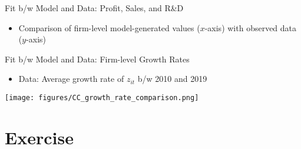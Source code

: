\documentclass[
  10pt,               %
  aspectratio=169,     %
]{beamer}
\theoremstyle{plain}
\begin{document}
\begin{frame}{Fit b/w Model and Data: Profit, Sales, and R\&D}
  \begin{itemize}
    \item Comparison of firm-level model-generated values ($x$-axis) with observed data ($y$-axis)
  \end{itemize}
  \medskip{}
  \begin{center}
    \begin{figure}
      \centering{}\setcounter{subfigure}{0}
    \end{figure}
    \par\end{center}
\end{frame}

\begin{frame}{Fit b/w Model and Data: Firm-level Growth Rates}
  \begin{itemize}
    \item Data: Average growth rate of $z_{it}$ b/w 2010 and 2019
  \end{itemize}
  \medskip{}
  \begin{center}
    \texttt{[image: figures/CC\_growth\_rate\_comparison.png]}
  \end{center}
\end{frame}

\section{Exercise}
\end{document}
